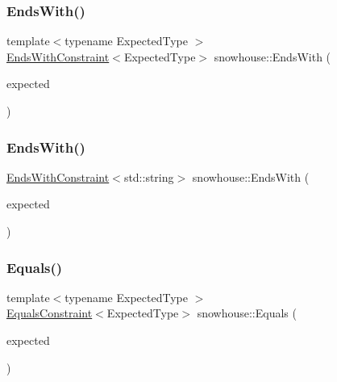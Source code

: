 \mbox{\label{namespacesnowhouse_a989264d50c4a959ccdb0041eb51b164a}} 
\subsubsection{\texorpdfstring{EndsWith()}{EndsWith()}\hspace{0.1cm}{\footnotesize\ttfamily [1/2]}}
{\footnotesize\ttfamily template$<$typename Expected\+Type $>$ \\
\mbox{\hyperlink{structsnowhouse_1_1EndsWithConstraint}{Ends\+With\+Constraint}}$<$Expected\+Type$>$ snowhouse\+::\+Ends\+With (\begin{DoxyParamCaption}\item[{const Expected\+Type \&}]{expected }\end{DoxyParamCaption})\hspace{0.3cm}{\ttfamily [inline]}}

\mbox{\label{namespacesnowhouse_a94ebdf61c89a001f203c92c8c97391a5}} 
\subsubsection{\texorpdfstring{EndsWith()}{EndsWith()}\hspace{0.1cm}{\footnotesize\ttfamily [2/2]}}
{\footnotesize\ttfamily \mbox{\hyperlink{structsnowhouse_1_1EndsWithConstraint}{Ends\+With\+Constraint}}$<$std\+::string$>$ snowhouse\+::\+Ends\+With (\begin{DoxyParamCaption}\item[{const char $\ast$}]{expected }\end{DoxyParamCaption})\hspace{0.3cm}{\ttfamily [inline]}}

\mbox{\label{namespacesnowhouse_a39f889099be8440c98dab750540c10c1}} 
\subsubsection{\texorpdfstring{Equals()}{Equals()}\hspace{0.1cm}{\footnotesize\ttfamily [1/2]}}
{\footnotesize\ttfamily template$<$typename Expected\+Type $>$ \\
\mbox{\hyperlink{structsnowhouse_1_1EqualsConstraint}{Equals\+Constraint}}$<$Expected\+Type$>$ snowhouse\+::\+Equals (\begin{DoxyParamCaption}\item[{const Expected\+Type \&}]{expected }\end{DoxyParamCaption})\hspace{0.3cm}{\ttfamily [inline]}}

